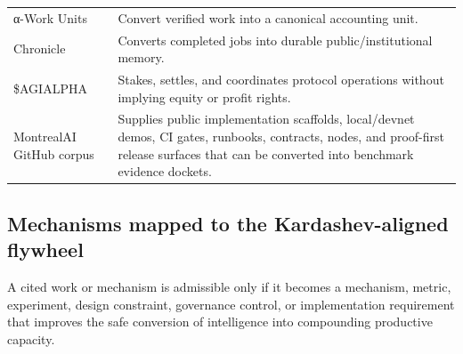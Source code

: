 \documentclass[
  11pt,
]{article}
\begin{document}
\begin{longtable}[]{@{}
  >{\raggedright\arraybackslash}p{}
  >{\raggedright\arraybackslash}p{}@{}}
α-Work Units & Convert verified work into a canonical accounting
unit. \\
Chronicle & Converts completed jobs into durable public/institutional
memory. \\
\$AGIALPHA & Stakes, settles, and coordinates protocol operations
without implying equity or profit rights. \\
MontrealAI GitHub corpus & Supplies public implementation scaffolds,
local/devnet demos, CI gates, runbooks, contracts, nodes, and
proof-first release surfaces that can be converted into benchmark
evidence dockets. \\
\end{longtable}

\subsection{Mechanisms mapped to the Kardashev-aligned
flywheel}\label{mechanisms-mapped-to-the-kardashev-aligned-flywheel}

A cited work or mechanism is admissible only if it becomes a mechanism,
metric, experiment, design constraint, governance control, or
implementation requirement that improves the safe conversion of
intelligence into compounding productive capacity.
\end{document}
